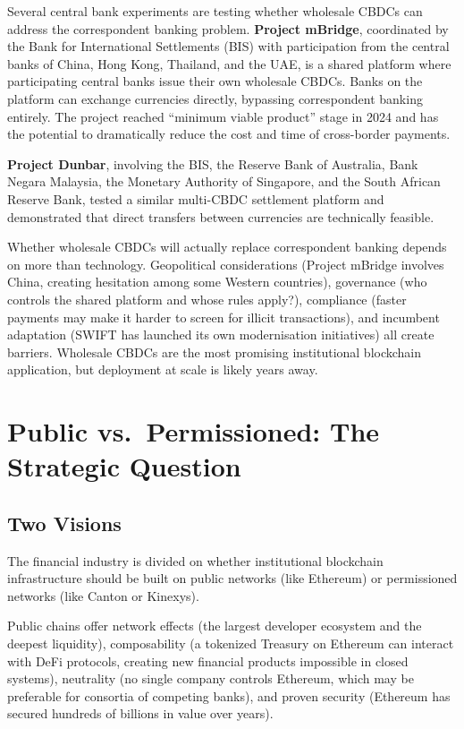 \documentclass[11pt,a4paper]{article}
\newcommand{\keyword}[1]{\textbf{\textcolor{AccentOrange}{#1}}}
\begin{document}
Several central bank experiments are testing whether wholesale CBDCs can address the correspondent banking problem. \keyword{Project mBridge}, coordinated by the Bank for International Settlements (BIS) with participation from the central banks of China, Hong Kong, Thailand, and the UAE, is a shared platform where participating central banks issue their own wholesale CBDCs. Banks on the platform can exchange currencies directly, bypassing correspondent banking entirely. The project reached ``minimum viable product'' stage in 2024 and has the potential to dramatically reduce the cost and time of cross-border payments.

\keyword{Project Dunbar}, involving the BIS, the Reserve Bank of Australia, Bank Negara Malaysia, the Monetary Authority of Singapore, and the South African Reserve Bank, tested a similar multi-CBDC settlement platform and demonstrated that direct transfers between currencies are technically feasible.

Whether wholesale CBDCs will actually replace correspondent banking depends on more than technology. Geopolitical considerations (Project mBridge involves China, creating hesitation among some Western countries), governance (who controls the shared platform and whose rules apply?), compliance (faster payments may make it harder to screen for illicit transactions), and incumbent adaptation (SWIFT has launched its own modernisation initiatives) all create barriers. Wholesale CBDCs are the most promising institutional blockchain application, but deployment at scale is likely years away.

\section{Public vs.\ Permissioned: The Strategic Question}

\subsection{Two Visions}

The financial industry is divided on whether institutional blockchain infrastructure should be built on public networks (like Ethereum) or permissioned networks (like Canton or Kinexys).

Public chains offer network effects (the largest developer ecosystem and the deepest liquidity), composability (a tokenized Treasury on Ethereum can interact with DeFi protocols, creating new financial products impossible in closed systems), neutrality (no single company controls Ethereum, which may be preferable for consortia of competing banks), and proven security (Ethereum has secured hundreds of billions in value over years).
\end{document}
